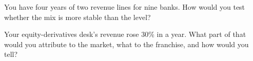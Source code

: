 \begin{interviewq}\label{iq:in:bank-markets-divisions:5}
You have four years of two revenue lines for nine banks. How would you test whether the mix is more stable than the
level?
\end{interviewq}

\begin{interviewq}\label{iq:in:bank-markets-divisions:6}
Your equity-derivatives desk's revenue rose 30\% in a year. What part of that would you attribute to the market, what to
the franchise, and how would you tell?
\end{interviewq}
